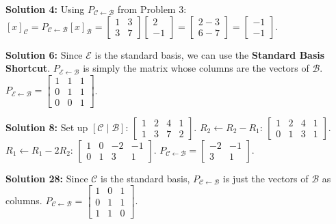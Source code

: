 \documentclass[11pt]{article}
\begin{document}
\vspace{0.5cm}
\textbf{Solution 4:} Using $P_{\mathcal{C} \leftarrow \mathcal{B}}$ from Problem 3:
$[x]_{\mathcal{C}} = P_{\mathcal{C} \leftarrow \mathcal{B}}[x]_{\mathcal{B}} = \begin{bmatrix} 1 & 3 \\ 3 & 7 \end{bmatrix} \begin{bmatrix} 2 \\ -1 \end{bmatrix} = \begin{bmatrix} 2 - 3 \\ 6 - 7 \end{bmatrix} = \begin{bmatrix} -1 \\ -1 \end{bmatrix}$.

\vspace{0.5cm}
\textbf{Solution 6:} Since $\mathcal{E}$ is the standard basis, we can use the \textbf{Standard Basis Shortcut}. $P_{\mathcal{E} \leftarrow \mathcal{B}}$ is simply the matrix whose columns are the vectors of $\mathcal{B}$.
$P_{\mathcal{E} \leftarrow \mathcal{B}} = \begin{bmatrix} 1 & 1 & 1 \\ 0 & 1 & 1 \\ 0 & 0 & 1 \end{bmatrix}$.

\vspace{0.5cm}
\textbf{Solution 8:} Set up $[\mathcal{C} \mid \mathcal{B}]$:
$\begin{bmatrix} 1 & 2 & 4 & 1 \\ 1 & 3 & 7 & 2 \end{bmatrix}$.
$R_2 \leftarrow R_2 - R_1$: $\begin{bmatrix} 1 & 2 & 4 & 1 \\ 0 & 1 & 3 & 1 \end{bmatrix}$.
$R_1 \leftarrow R_1 - 2R_2$: $\begin{bmatrix} 1 & 0 & -2 & -1 \\ 0 & 1 & 3 & 1 \end{bmatrix}$.
$P_{\mathcal{C} \leftarrow \mathcal{B}} = \begin{bmatrix} -2 & -1 \\ 3 & 1 \end{bmatrix}$.

\vspace{0.5cm}
\textbf{Solution 28:} Since $\mathcal{C}$ is the standard basis, $P_{\mathcal{C} \leftarrow \mathcal{B}}$ is just the vectors of $\mathcal{B}$ as columns.
$P_{\mathcal{C} \leftarrow \mathcal{B}} = \begin{bmatrix} 1 & 0 & 1 \\ 0 & 1 & 1 \\ 1 & 1 & 0 \end{bmatrix}$.
\end{document}
